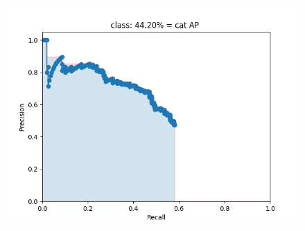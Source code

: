 \documentclass{article}%
\begin{document}
\begin{figure}[H]
\begin{minipage}{0.24\linewidth}
	\end{minipage}
    \begin{minipage}{0.24\linewidth}
		\centering
		\includegraphics[width=0.9\linewidth]{fast_rcnn/mAP_output/classes/cat.png}
	\end{minipage}
\end{figure}
\end{document}
